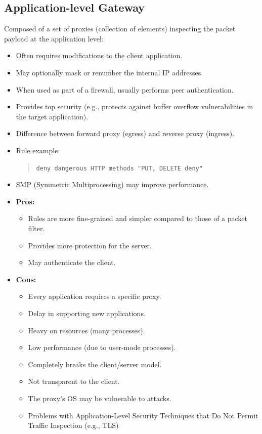 \subsection{Application-level Gateway}
Composed of a set of proxies (collection of elements) inspecting the packet payload at the application level:
\begin{itemize}
    \item Often requires modifications to the client application.
    \item May optionally mask or renumber the internal IP addresses.
    \item When used as part of a firewall, usually performs peer authentication.
    \item Provides top security (e.g., protects against buffer overflow vulnerabilities in the target application).
    \item Difference between forward proxy (egress) and reverse proxy (ingress).
    \item Rule example:
    \begin{quote}
        \texttt{deny dangerous HTTP methods "PUT, DELETE deny"}
    \end{quote}
    \item SMP (Symmetric Multiprocessing) may improve performance.
\end{itemize}

\begin{itemize}
    \item \textbf{Pros:}
    \begin{itemize}
        \item Rules are more fine-grained and simpler compared to those of a packet filter.
        \item Provides more protection for the server.
        \item May authenticate the client.
    \end{itemize}
    \item \textbf{Cons:}
    \begin{itemize}
        \item Every application requires a specific proxy.
        \item Delay in supporting new applications.
        \item Heavy on resources (many processes).
        \item Low performance (due to user-mode processes).
        \item Completely breaks the client/server model.
        \item Not transparent to the client.
        \item The proxy's OS may be vulnerable to attacks.
        \item Problems with Application-Level Security Techniques that Do Not Permit Traffic Inspection (e.g., TLS)
    \end{itemize}
\end{itemize}

